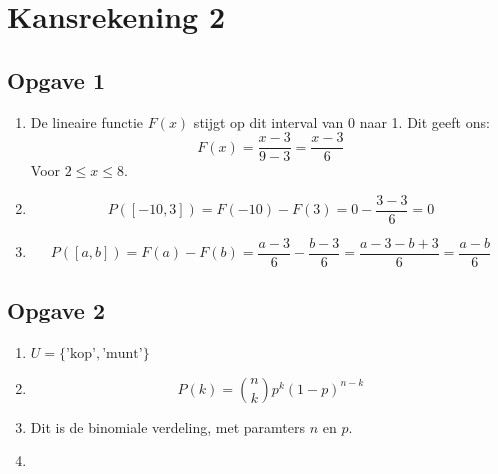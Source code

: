 \documentclass[a4paper,12px]{article}
\begin{document}


\section{Kansrekening 2}
\subsection{Opgave 1}
\begin{enumerate}[label=(\alph*)]
    \item De lineaire functie $F(x)$ stijgt op dit interval van 0 naar 1. Dit geeft ons:
    \begin{equation}
        F(x)=\dfrac{x-3}{9-3}=\dfrac{x-3}{6}
    \end{equation}
    Voor $2\leq x \leq 8$.
    \item
        \begin{equation}
            P([-10,3])=F(-10)-F(3)=0-\dfrac{3-3}{6}=0
        \end{equation}
    \item
        \begin{equation}
            P([a,b])=F(a)-F(b)=\dfrac{a-3}{6}-\dfrac{b-3}{6}=\dfrac{a-3-b+3}{6}=\dfrac{a-b}{6}
        \end{equation}
\end{enumerate}
\subsection{Opgave 2}
\begin{enumerate}[label=(\alph*)]
    \item $U=\{\text{'kop'},\text{'munt'}\}$
    \item
        \begin{equation}
            P(k)=\binom{n}{k}p^k(1-p)^{n-k}
        \end{equation}
    \item Dit is de binomiale verdeling, met paramters $n$ en $p$.
    \item 
\end{enumerate}
\end{document}
